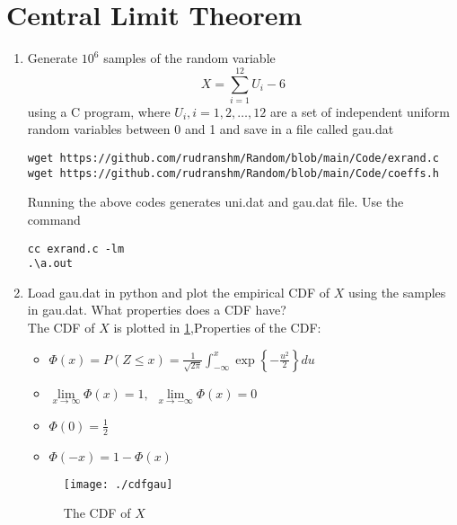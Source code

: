 \documentclass[journal,12pt,twocolumn]{IEEEtran}
\begin{document}
\section{Central Limit Theorem}
%
\begin{enumerate}[label=\thesection.\arabic*
,ref=\thesection.\theenumi]

%
\item
Generate $10^6$ samples of the random variable
%
\begin{equation}
X = \sum_{i=1}^{12}U_i -6
\end{equation}
%
using a C program, where $U_i, i = 1,2,\dots, 12$ are  a set of independent uniform random variables between 0 and 1
and save in a file called gau.dat
\\
\solution
\begin{lstlisting}
wget https://github.com/rudranshm/Random/blob/main/Code/exrand.c
wget https://github.com/rudranshm/Random/blob/main/Code/coeffs.h
\end{lstlisting}
Running the above codes generates uni.dat and gau.dat file.
Use the command 
\begin{lstlisting}
cc exrand.c -lm
.\a.out
\end{lstlisting}
%
\item
Load gau.dat in python and plot the empirical CDF of $X$ using the samples in gau.dat. What properties does a CDF have?
\\
\solution 
The CDF of $X$ is plotted in \ref{fig:gau_cdf},Properties of the CDF:
\begin{itemize}
\item $\Phi(x)=P(Z \leq x)= \frac{1}{\sqrt{2 \pi}} \int_{-\infty}^{x}\exp\left\{-\frac{u^2}{2}\right\} du$
\item $\lim \limits_{x\rightarrow \infty} \Phi(x)=1, \hspace{5pt} \lim \limits_{x\rightarrow -\infty} \Phi(x)=0$
\item  $\Phi(0)=\frac{1}{2}$
\item  $\Phi(-x)=1-\Phi(x)$
\end{itemize}

\begin{figure}[h]
\centering
\texttt{[image: ./cdfgau]}
\caption{The CDF of $X$}
\label{fig:gau_cdf}
\end{figure}


\end{enumerate}
\end{document}
